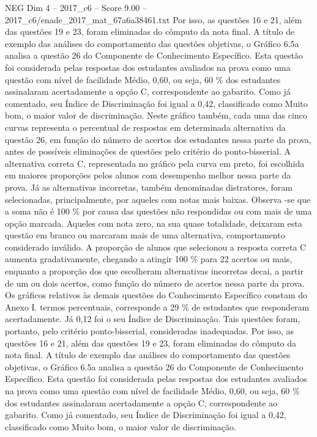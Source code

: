 \begin{textsample}{NEG Dim 4 – 2017\_c6 – Score 9.00 – 2017\_c6/enade\_2017\_mat\_67a6a38461.txt}
Por isso, as questões 16 e 21, além das questões 19 e 23, foram eliminadas do cômputo da nota final.
A título de exemplo das análises do comportamento das questões objetivas, o Gráfico 6.5a analisa a questão 26 do Componente de Conhecimento Específico.
Esta questão foi considerada pelas respostas dos estudantes avaliados na prova como uma questão com nível de facilidade Médio, 0,60, ou seja, 60 \% dos estudantes assinalaram acertadamente a opção C, correspondente ao gabarito.
Como já comentado, seu Índice de Discriminação foi igual a 0,42, classificado como Muito bom, o maior valor de discriminação.
Neste gráfico também, cada uma das cinco curvas representa o percentual de respostas em determinada alternativa da questão 26, em função do número de acertos dos estudantes nessa parte da prova, antes de possíveis eliminações de questões pelo critério do ponto-bisserial.
A alternativa correta C, representada no gráfico pela curva em preto, foi escolhida em maiores proporções pelos alunos com desempenho melhor nessa parte da prova.
Já as alternativas incorretas, também denominadas distratores, foram selecionadas, principalmente, por aqueles com notas mais baixas.
Observa -se que a soma não é 100 \% por causa das questões não respondidas ou com mais de uma opção marcada.
Aqueles com nota zero, na sua quase totalidade, deixaram esta questão em branco ou marcaram mais de uma alternativa, comportamento considerado inválido.
A proporção de alunos que selecionou a resposta correta C aumenta gradativamente, chegando a atingir 100 \% para 22 acertos ou mais, enquanto a proporção dos que escolheram alternativas incorretas decai, a partir de um ou dois acertos, como função do número de acertos nessa parte da prova.
Os gráficos relativos às demais questões do Conhecimento Específico constam do Anexo I. termos percentuais, corresponde a 29 \% de estudantes que responderam acertadamente.
Já 0,12 foi o seu Índice de Discriminação.
Tais questões foram, portanto, pelo critério ponto-bisserial, consideradas inadequadas.
Por isso, as questões 16 e 21, além das questões 19 e 23, foram eliminadas do cômputo da nota final.
A título de exemplo das análises do comportamento das questões objetivas, o Gráfico 6.5a analisa a questão 26 do Componente de Conhecimento Específico.
Esta questão foi considerada pelas respostas dos estudantes avaliados na prova como uma questão com nível de facilidade Médio, 0,60, ou seja, 60 \% dos estudantes assinalaram acertadamente a opção C, correspondente ao gabarito.
Como já comentado, seu Índice de Discriminação foi igual a 0,42, classificado como Muito bom, o maior valor de discriminação.

\end{textsample}
